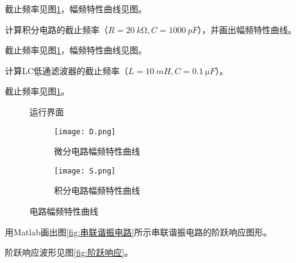 \begin{Answer}
	截止频率见图\ref{fig:运行界面code33.m}，幅频特性曲线见图。
\end{Answer}

\begin{Exercise}
	计算积分电路的截止频率（$ R=\SI{20}{k\ohm},C=\SI{1000}{pF} $），并画出幅频特性曲线。
\end{Exercise}

\begin{Answer}
	截止频率见图\ref{fig:运行界面code33.m}，幅频特性曲线见图。
\end{Answer}

\begin{Exercise}
	计算LC低通滤波器的截止频率（$ L=\SI{10}{mH},C=\SI{0.1}{\micro F} $）。
\end{Exercise}

\begin{Answer}
	截止频率见图\ref{fig:运行界面code33.m}。
\end{Answer}


\begin{figure}[htpb]
	\centering
	\caption{运行界面}
	\label{fig:运行界面code33.m}
\end{figure}

\begin{figure}[htpb]
	\centering
	\begin{subfigure}[htpb]{.45\linewidth}
		\centering
		\texttt{[image: D.png]}
		\caption{微分电路幅频特性曲线}
		\label{fig:微分电路幅频特性曲线}
	\end{subfigure}
	\quad
	\begin{subfigure}[htpb]{.45\linewidth}
		\centering
		\texttt{[image: S.png]}
		\caption{积分电路幅频特性曲线}
		\label{fig:积分电路幅频特性曲线}
	\end{subfigure}
	\caption{电路幅频特性曲线}
	\label{fig:电路幅频特性曲线}
\end{figure}

\begin{Exercise}
	用Matlab画出图\ref{fig:串联谐振电路}所示串联谐振电路的阶跃响应图形。
\end{Exercise}

\begin{Answer}
	阶跃响应波形见图\ref{fig:阶跃响应}。
\end{Answer}

